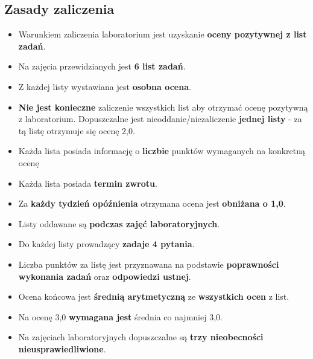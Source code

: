 \subsection{Zasady zaliczenia}
\begin{itemize}
  \item Warunkiem zaliczenia laboratorium jest uzyskanie \textbf{oceny pozytywnej z list zadań}.
  \item Na zajęcia przewidzianych jest \textbf{6 list zadań}.
  \item Z każdej listy wystawiana jest \textbf{osobna ocena}.
  \item \textbf{Nie jest konieczne} zaliczenie wszystkich list aby otrzymać ocenę pozytywną z laboratorium. Dopuszczalne jest nieoddanie/niezaliczenie \textbf{jednej listy} - za tą listę otrzymuje się ocenę 2,0.
  \item Każda lista posiada informację o \textbf{liczbie} punktów wymaganych na konkretną ocenę
  \item Każda lista posiada \textbf{termin zwrotu}.
  \item Za \textbf{każdy tydzień opóźnienia} otrzymana ocena jest \textbf{obniżana o 1,0}.
  \item Listy oddawane są \textbf{podczas zajęć laboratoryjnych}. 
  \item Do każdej listy prowadzący \textbf{zadaje 4 pytania}.
  \item Liczba punktów za listę jest przyznawana na podstawie \textbf{poprawności wykonania zadań} oraz \textbf{odpowiedzi ustnej}.
  \item Ocena końcowa jest \textbf{średnią arytmetyczną} ze \textbf{wszystkich ocen} z list.
  \item Na ocenę 3,0 \textbf{wymagana jest} średnia co najmniej 3,0.
  \item Na zajęciach laboratoryjnych dopuszczalne są \textbf{trzy nieobecności nieusprawiedliwione}.
\end{itemize}

